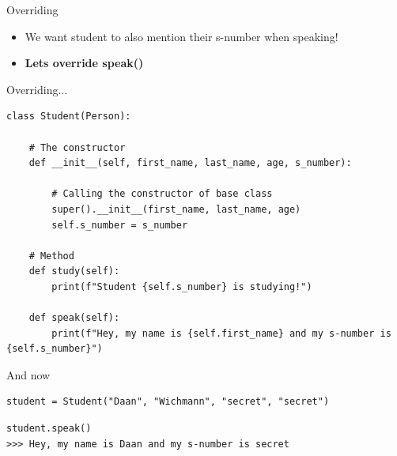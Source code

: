 \begin{frame}{Overriding}
\begin{itemize}
    \item We want student to also mention their s-number when speaking!
    \item \textbf{Lets override speak()}
\end{itemize}
\end{frame}

\begin{frame}[fragile]{Overriding...}
\begin{verbatim}
class Student(Person):

    # The constructor
    def __init__(self, first_name, last_name, age, s_number):
    
        # Calling the constructor of base class
        super().__init__(first_name, last_name, age)
        self.s_number = s_number

    # Method
    def study(self):
        print(f"Student {self.s_number} is studying!")

    def speak(self):
        print(f"Hey, my name is {self.first_name} and my s-number is {self.s_number}")
\end{verbatim}
\end{frame}

\begin{frame}[fragile]{And now}
\pause
\begin{verbatim}
student = Student("Daan", "Wichmann", "secret", "secret")
\end{verbatim}
\pause
\begin{verbatim}
student.speak()
>>> Hey, my name is Daan and my s-number is secret
\end{verbatim}
\end{frame}

